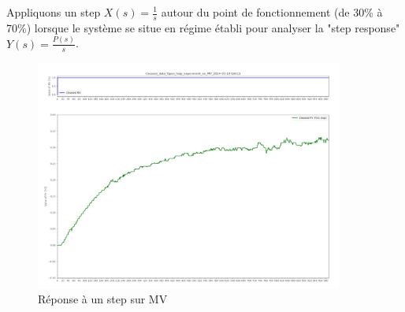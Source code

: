 \documentclass{article}
\begin{document}
Appliquons un step $X(s) = \frac{1}{s}$ autour du point de fonctionnement (de 30\% à 70\%) lorsque le système se situe en régime établi pour analyser la "step response" $Y(s) = \frac{P(s)}{s}$.
\begin{figure}[h]
    \centering
    \includegraphics[width=0.9\textwidth]{../Plots/Graphical_methods_Cleaned_data_Open_loop_experiment_on_MV_2024-03-18-16h11.png}
    \caption{Réponse à un step sur MV}
    \label{fig:MV_step_response}
\end{figure}
\end{document}
